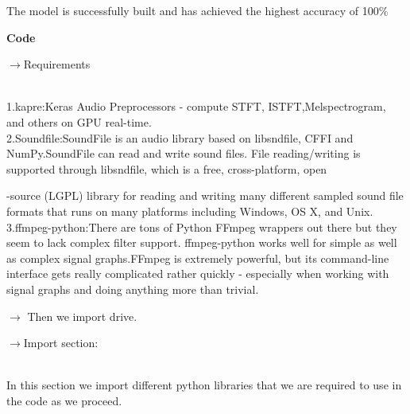 \documentclass[a4paper,12pt]{article}
\begin{document}
The model is successfully built and has achieved the highest accuracy of 100\%\\

\pagebreak

\textbf{Code}

\begin{large}
$\rightarrow$Requirements
\end{large}\\

1.kapre:Keras Audio Preprocessors - compute STFT, ISTFT,Melspectrogram,
 \hspace*{0.5cm} and others on GPU real-time.\\
 

2.Soundfile:SoundFile is an audio library based on libsndfile, CFFI and
 \hspace*{0.5cm}     NumPy.SoundFile can read and write sound files. File reading/writing 
 \hspace*{0.5cm} is supported through libsndfile, which is a free, cross-platform, open
 
         \hspace*{0.5cm}-source (LGPL) library for reading and writing many different sampled
          \hspace*{0.5cm} sound file formats that runs on many platforms including Windows, OS
          \hspace*{0.5cm} X, and Unix.\\

3.ffmpeg-python:There are tons of Python FFmpeg wrappers out there
\hspace*{0.5cm} but they seem to lack complex filter support. ffmpeg-python works well
\hspace*{0.5cm} for simple as well as complex signal graphs.FFmpeg is extremely powerful,
\hspace*{0.5cm} but its command-line interface gets really complicated rather quickly -
\hspace*{0.5cm} especially when working with signal graphs and doing anything more than \hspace*{0.5cm} trivial.

$\rightarrow$ Then we import drive.\\

\begin{large}
$\rightarrow$Import section:
\end{large}\\

In this section we import different python libraries that we are required
\hspace*{0.5cm} to use in the code as we proceed.\\
\end{document}
